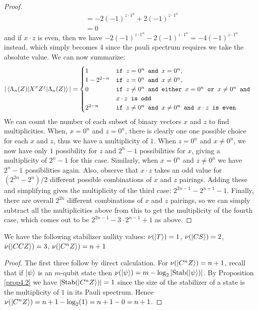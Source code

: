 \documentclass[12pt]{dalthesis}
\begin{document}
\begin{proof}
\begin{equation*}
\begin{split}
& = -2(-1)^{z \cdot 1^n} + 2(-1)^{z \cdot 1^n} \\
& = 0
\end{split}
\end{equation*}
and if $x \cdot z$ is even, then we have $-2(-1)^{z \cdot 1^n} - 2(-1)^{z \cdot 1^n} = -4(-1)^{z \cdot 1^n}$ instead, which simply becomes $4$ since the pauli spectrum requires we take the absolute value. We can now summarize:
\begin{equation*}
|\braket{\Lambda_n (Z)|X^xZ^z|\Lambda_n (Z)}| = \begin{cases}
1 & \texttt{if } z = 0^n \texttt{ and } x = 0^n, \\
1 - 2^{2-n} & \texttt{if } z = 0^n \texttt{ and } x \neq 0^n, \\
0 & \texttt{if } z \neq 0^n \texttt{ and either } x = 0^n \texttt{ or } x \neq 0^n \texttt{ and } \\
& x \cdot z \texttt{ is odd} \\
2^{2-n} & \texttt{if } z \neq 0^n \texttt{ and } x \neq 0^n
 \texttt{ and } x \cdot z \texttt{ is even}
\end{cases}
\end{equation*}
We can count the number of each subset of binary vectors $x$ and $z$ to find multiplicities. When, $x=0^n$ and $z = 0^n$, there is clearly one one possible choice for each $x$ and $z$, thus we have a multiplicity of $1$. When $z = 0^n$ and $x \neq 0^n$, we now have only $1$ possibility for $z$ and $2^n - 1$ possibilities for $x$, giving a multiplicity of $2^n - 1$ for this case. Similarly, when $x = 0^n$ and $z \neq 0^n$ we have $2^n - 1$ possibilities again. Also, observe that $x \cdot z$ takes an odd value for $(2^{2n}-2^{n})/2$ different possible combinations of $x$ and $z$ pairings. Adding these and simplifying gives the multiplicity of the third case: $2^{2n-1} - 2^{n+1} - 1$. Finally, there are overall $2^{2n}$ different combinations of $x$ and $z$ pairings, so we can simply subtract all the multiplicities above from this to get the multiplicity of the fourth case, which comes out to be $2^{2n-1} - 3 \cdot 2^{n-1} + 1$ as above.
\end{proof}

\begin{corollary}
\label{nu values}
We have the following stabilizer nullity values: $\nu (\ket{T}) = 1$, $\nu (\ket{CS}) = 2$, $\nu (\ket{CCZ}) = 3$, $\nu (\ket{C^n Z}) = n+1$
\end{corollary}
\begin{proof}

The first three follow by direct calculation. For $\nu (\ket{C^n Z}) = n+1$, recall that if $\ket{\psi}$ is an $m$-qubit state then $\nu
(\ket{\psi}) = m - \log_2|\mathrm{Stab}(\ket{\psi})|$. By
Proposition \ref{prop4.2} we have $|\mathrm{Stab}(\ket{C^n Z})| = 1$ since the size of the stabilizer of a state is the multiplicity of $1$ in its Pauli spectrum. Hence $\nu (\ket{C^n Z}) = n+1 - \log_2 (1) = n+1-0 = n+1$.
\end{proof}
\end{document}
